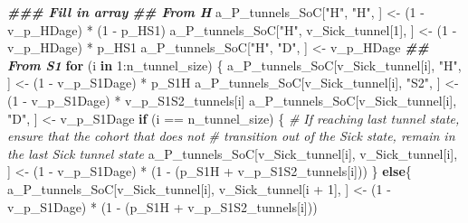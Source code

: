 \documentclass[
]{article}
\newenvironment{Shaded}{\begin{snugshade}}{\end{snugshade}}
\newcommand{\CommentTok}[1]{\textcolor[rgb]{0.56,0.35,0.01}{\textit{#1}}}
\newcommand{\ControlFlowTok}[1]{\textcolor[rgb]{0.13,0.29,0.53}{\textbf{#1}}}
\newcommand{\DecValTok}[1]{\textcolor[rgb]{0.00,0.00,0.81}{#1}}
\newcommand{\DocumentationTok}[1]{\textcolor[rgb]{0.56,0.35,0.01}{\textbf{\textit{#1}}}}
\newcommand{\NormalTok}[1]{#1}
\newcommand{\OtherTok}[1]{\textcolor[rgb]{0.56,0.35,0.01}{#1}}
\newcommand{\SpecialCharTok}[1]{\textcolor[rgb]{0.00,0.00,0.00}{#1}}
\newcommand{\StringTok}[1]{\textcolor[rgb]{0.31,0.60,0.02}{#1}}
\begin{document}
\begin{Shaded}
\begin{Highlighting}[]
\DocumentationTok{\#\#\# Fill in array}
\DocumentationTok{\#\# From H}
\NormalTok{a\_P\_tunnels\_SoC[}\StringTok{"H"}\NormalTok{, }\StringTok{"H"}\NormalTok{, ]              }\OtherTok{\textless{}{-}}\NormalTok{ (}\DecValTok{1} \SpecialCharTok{{-}}\NormalTok{ v\_p\_HDage) }\SpecialCharTok{*}\NormalTok{ (}\DecValTok{1} \SpecialCharTok{{-}}\NormalTok{ p\_HS1)}
\NormalTok{a\_P\_tunnels\_SoC[}\StringTok{"H"}\NormalTok{, v\_Sick\_tunnel[}\DecValTok{1}\NormalTok{], ] }\OtherTok{\textless{}{-}}\NormalTok{ (}\DecValTok{1} \SpecialCharTok{{-}}\NormalTok{ v\_p\_HDage) }\SpecialCharTok{*}\NormalTok{ p\_HS1}
\NormalTok{a\_P\_tunnels\_SoC[}\StringTok{"H"}\NormalTok{, }\StringTok{"D"}\NormalTok{, ]              }\OtherTok{\textless{}{-}}\NormalTok{ v\_p\_HDage}
\DocumentationTok{\#\# From S1}
\ControlFlowTok{for}\NormalTok{ (i }\ControlFlowTok{in} \DecValTok{1}\SpecialCharTok{:}\NormalTok{n\_tunnel\_size) \{}
\NormalTok{  a\_P\_tunnels\_SoC[v\_Sick\_tunnel[i], }\StringTok{"H"}\NormalTok{, ]  }\OtherTok{\textless{}{-}}\NormalTok{ (}\DecValTok{1} \SpecialCharTok{{-}}\NormalTok{ v\_p\_S1Dage) }\SpecialCharTok{*}\NormalTok{ p\_S1H}
\NormalTok{  a\_P\_tunnels\_SoC[v\_Sick\_tunnel[i], }\StringTok{"S2"}\NormalTok{, ] }\OtherTok{\textless{}{-}}\NormalTok{ (}\DecValTok{1} \SpecialCharTok{{-}}\NormalTok{ v\_p\_S1Dage) }\SpecialCharTok{*}\NormalTok{ v\_p\_S1S2\_tunnels[i]}
\NormalTok{  a\_P\_tunnels\_SoC[v\_Sick\_tunnel[i], }\StringTok{"D"}\NormalTok{, ]  }\OtherTok{\textless{}{-}}\NormalTok{ v\_p\_S1Dage}
  \ControlFlowTok{if}\NormalTok{ (i }\SpecialCharTok{==}\NormalTok{ n\_tunnel\_size) \{}
    \CommentTok{\# If reaching last tunnel state, ensure that the cohort that does not}
    \CommentTok{\# transition out of the Sick state, remain in the last Sick tunnel state}
\NormalTok{    a\_P\_tunnels\_SoC[v\_Sick\_tunnel[i],}
\NormalTok{                    v\_Sick\_tunnel[i], ] }\OtherTok{\textless{}{-}}\NormalTok{ (}\DecValTok{1} \SpecialCharTok{{-}}\NormalTok{ v\_p\_S1Dage) }\SpecialCharTok{*}
\NormalTok{      (}\DecValTok{1} \SpecialCharTok{{-}}\NormalTok{ (p\_S1H }\SpecialCharTok{+}\NormalTok{ v\_p\_S1S2\_tunnels[i]))}
\NormalTok{  \} }\ControlFlowTok{else}\NormalTok{\{}
\NormalTok{    a\_P\_tunnels\_SoC[v\_Sick\_tunnel[i], }
\NormalTok{                    v\_Sick\_tunnel[i }\SpecialCharTok{+} \DecValTok{1}\NormalTok{], ]   }\OtherTok{\textless{}{-}}\NormalTok{ (}\DecValTok{1} \SpecialCharTok{{-}}\NormalTok{ v\_p\_S1Dage) }\SpecialCharTok{*}
\NormalTok{      (}\DecValTok{1} \SpecialCharTok{{-}}\NormalTok{ (p\_S1H }\SpecialCharTok{+}\NormalTok{ v\_p\_S1S2\_tunnels[i]))}

\end{Highlighting}
\end{Shaded}
\end{document}
